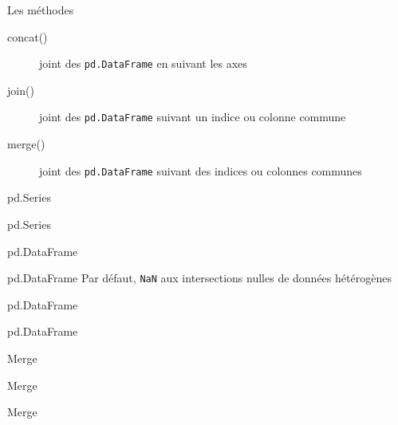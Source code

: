 
\begin{frame}{Les méthodes}
  \begin{description}
    \item[concat()] joint des \texttt{pd.DataFrame} en suivant les axes
    \item[join()]   joint des \texttt{pd.DataFrame} suivant un indice ou colonne commune
    \item[merge()]  joint des \texttt{pd.DataFrame} suivant des indices ou colonnes communes
  \end{description}
\end{frame}

\begin{frame}{pd.Series}
\end{frame}

\begin{frame}{pd.Series}
\end{frame}

\begin{frame}{pd.DataFrame}
\end{frame}

\begin{frame}{pd.DataFrame}
  Par défaut, \texttt{NaN} aux intersections nulles de données hétérogènes\\
\end{frame}

\begin{frame}{pd.DataFrame}
\end{frame}

\begin{frame}{pd.DataFrame}
\end{frame}


\begin{frame}{Merge}
\end{frame}

\begin{frame}{Merge}
\end{frame}

\begin{frame}{Merge}
\end{frame}

